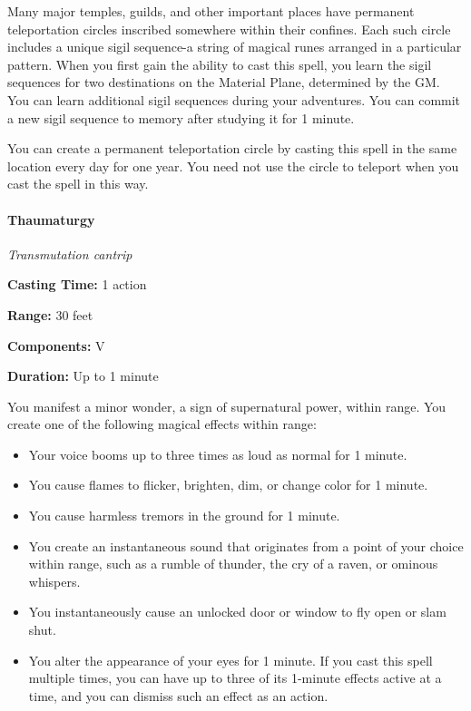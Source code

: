 \documentclass[
]{article}
\providecommand{\tightlist}{%
  \setlength{\itemsep}{0pt}\setlength{\parskip}{0pt}}
\begin{document}
Many major temples, guilds, and other important places have permanent
teleportation circles inscribed somewhere within their confines. Each
such circle includes a unique sigil sequence-a string of magical runes
arranged in a particular pattern. When you first gain the ability to
cast this spell, you learn the sigil sequences for two destinations on
the Material Plane, determined by the GM. You can learn additional sigil
sequences during your adventures. You can commit a new sigil sequence to
memory after studying it for 1 minute.

You can create a permanent teleportation circle by casting this spell in
the same location every day for one year. You need not use the circle to
teleport when you cast the spell in this way.

\hypertarget{thaumaturgy}{%
\paragraph{Thaumaturgy}\label{thaumaturgy}}

\emph{Transmutation cantrip}

\textbf{Casting Time:} 1 action

\textbf{Range:} 30 feet

\textbf{Components:} V

\textbf{Duration:} Up to 1 minute

You manifest a minor wonder, a sign of supernatural power, within range.
You create one of the following magical effects within range:

\begin{itemize}
\tightlist
\item
  Your voice booms up to three times as loud as normal for 1 minute.
\item
  You cause flames to flicker, brighten, dim, or change color for 1
  minute.
\item
  You cause harmless tremors in the ground for 1 minute.
\item
  You create an instantaneous sound that originates from a point of your
  choice within range, such as a rumble of thunder, the cry of a raven,
  or ominous whispers.
\item
  You instantaneously cause an unlocked door or window to fly open or
  slam shut.
\item
  You alter the appearance of your eyes for 1 minute. If you cast this
  spell multiple times, you can have up to three of its 1-minute effects
  active at a time, and you can dismiss such an effect as an action.
\end{itemize}
\end{document}

